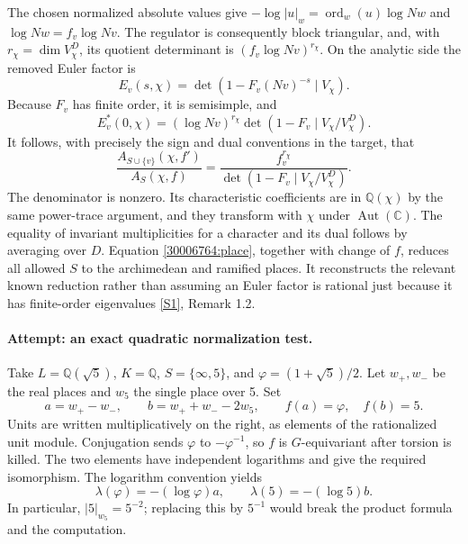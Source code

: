 \documentclass[11pt,a4paper]{article}
\newcommand{\Q}{\mathbb{Q}}
\newcommand{\C}{\mathbb{C}}
\newcommand{\sref}[2]{\hyperlink{source:#1:#2}{[S#2]}}
\numberwithin{equation}{section}
\begin{document}
The chosen normalized absolute values give
$-\log|u|_w=\operatorname{ord}_w(u)\log Nw$ and
$\log Nw=f_v\log Nv$. The regulator is consequently block triangular,
and, with $r_\chi=\dim V_\chi^D$, its quotient determinant is
$(f_v\log Nv)^{r_\chi}$. On the analytic side the removed Euler factor is
\begin{equation}
 E_v(s,\chi)=\det(1-F_v(Nv)^{-s}\mid V_\chi).
\end{equation}
Because $F_v$ has finite order, it is semisimple, and
\begin{equation}
 E_v^*(0,\chi)=(\log Nv)^{r_\chi}
  \det(1-F_v\mid V_\chi/V_\chi^D).
\end{equation}
It follows, with precisely the sign and dual conventions in the target,
that
\begin{equation}\label{30006764:place}
 \frac{A_{S\cup\{v\}}(\chi,f')}{A_S(\chi,f)}
 =\frac{f_v^{r_\chi}}
 {\det(1-F_v\mid V_\chi/V_\chi^D)}.
\end{equation}
The denominator is nonzero. Its characteristic coefficients are in
$\Q(\chi)$ by the same power-trace argument, and they transform with
$\chi$ under $\operatorname{Aut}(\C)$. The equality of invariant
multiplicities for a character and its dual follows by averaging over
$D$. Equation \eqref{30006764:place}, together with change of $f$, reduces
all allowed $S$ to the archimedean and ramified places. It reconstructs
the relevant known reduction rather than assuming an Euler factor is
rational just because it has finite-order eigenvalues
\sref{30006764}{1}, Remark 1.2.

\paragraph{Attempt: an exact quadratic normalization test.}
Take $L=\Q(\sqrt5)$, $K=\Q$, $S=\{\infty,5\}$, and
$\varphi=(1+\sqrt5)/2$. Let $w_+,w_-$ be the real places and $w_5$ the
single place over 5. Set
\begin{equation}
 a=w_+-w_-,\qquad b=w_++w_--2w_5,
 \qquad f(a)=\varphi,\quad f(b)=5.
\end{equation}
Units are written multiplicatively on the right, as elements of the
rationalized unit module. Conjugation sends $\varphi$ to
$-\varphi^{-1}$, so $f$ is $G$-equivariant after torsion is killed.
The two elements have independent logarithms and give the required
isomorphism. The logarithm convention yields
\begin{equation}
 \lambda(\varphi)=-(\log\varphi)a,\qquad
 \lambda(5)=-(\log5)b.
\end{equation}
In particular, $|5|_{w_5}=5^{-2}$; replacing this by $5^{-1}$ would
break the product formula and the computation.
\end{document}

